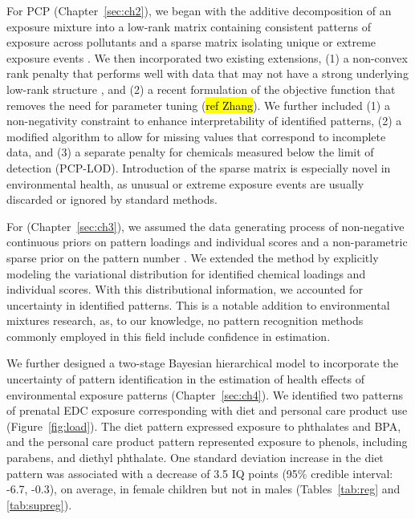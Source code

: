 For PCP (Chapter~\ref{sec:ch2}), we began with the additive decomposition of an exposure mixture into a low-rank matrix containing consistent patterns of exposure across pollutants and a sparse matrix isolating unique or extreme exposure events \citep{candes2011robust, zhou2010stable}. We then incorporated two existing extensions, (1) a non-convex rank penalty that performs well with data that may not have a strong underlying low-rank structure \citep{netrapalli2014non, chen2020bridging}, and (2) a recent formulation of the objective function that removes the need for parameter tuning (\hl{ref Zhang}). We further included (1) a non-negativity constraint to enhance interpretability of identified patterns, (2) a modified algorithm to allow for missing values that correspond to incomplete data, and (3) a separate penalty for chemicals measured below the limit of detection (PCP-LOD). Introduction of the sparse matrix is especially novel in environmental health, as unusual or extreme exposure events are usually discarded or ignored by standard methods.

For \bnmfc (Chapter~\ref{sec:ch3}), we assumed the data generating process of non-negative continuous priors on pattern loadings and individual scores and a non-parametric sparse prior on the pattern number \citep{holtzman2018machine}. We extended the method by explicitly modeling the variational distribution for identified chemical loadings and individual scores. With this distributional information, we accounted for uncertainty in identified patterns. This is a notable addition to environmental mixtures research, as, to our knowledge, no pattern recognition methods commonly employed in this field include confidence in estimation.

We further designed a two-stage Bayesian hierarchical model to incorporate the uncertainty of pattern identification in the estimation of health effects of environmental exposure patterns (Chapter~\ref{sec:ch4}). We identified two patterns of prenatal EDC exposure corresponding with diet and personal care product use (Figure~\ref{fig:load}). The diet pattern expressed exposure to phthalates and BPA, and the personal care product pattern represented exposure to phenols, including parabens, and diethyl phthalate. One standard deviation increase in the diet pattern was associated with a decrease of 3.5 IQ points (95\% credible interval: -6.7, -0.3), on average, in female children but not in males (Tables~\ref{tab:reg} and \ref{tab:supreg}).

